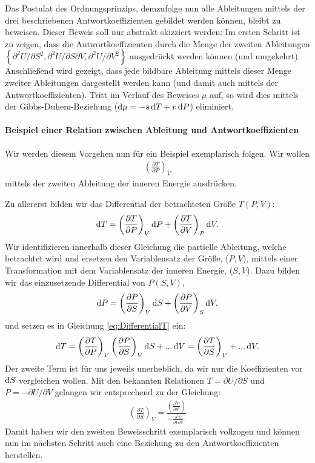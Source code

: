 	Das Postulat des Ordnungsprinzips, demzufolge nun alle Ableitungen mittels der drei beschriebenen Antwortkoeffizienten gebildet werden können, bleibt zu beweisen. Dieser Beweis soll nur abstrakt skizziert werden:
	Im ersten Schritt ist zu zeigen, dass die Antwortkoeffizienten durch die Menge der zweiten Ableitungen $\left\{\partial^2U/\partial S^2,\partial^2U/\partial S\partial V, \partial^2U/\partial V^2\right\}$ ausgedrückt werden können (und umgekehrt). Anschließend wird gezeigt, dass jede bildbare Ableitung mittels dieser Menge zweiter Ableitungen dargestellt werden kann (und damit auch mittels der Antwortkoeffizienten). Tritt im Verlauf des Beweises $\mu$ auf, so wird dies mittels der Gibbs-Duhem-Beziehung ($\mathop{}\!\mathrm{d} \mu =-s\mathop{}\!\mathrm{d} T+v\mathop{}\!\mathrm{d} P$) eliminiert.

	\paragraph*{Beispiel einer Relation zwischen Ableitung und Antwortkoeffizienten} Wir werden diesem Vorgehen nun für ein Beispiel exemplarisch folgen.
	Wir wollen 
	\begin{align*}
		\left(\frac{\partial T}{\partial P}\right)_V
	\end{align*}
	mittels der zweiten Ableitung der inneren Energie ausdrücken.

	Zu allererst bilden wir das Differential der betrachteten Größe $T(P,V)$:
	\begin{align}
		\label{eq:DifferentialT}
		\mathop{}\!\mathrm{d} T=\left(\frac{\partial T}{\partial P}\right)_V\mathop{}\!\mathrm{d} P+\left(\frac{\partial T}{\partial V}\right)_P \mathop{}\!\mathrm{d} V.
	\end{align}
Wir identifizieren innerhalb dieser Gleichung die partielle Ableitung, welche betrachtet wird und ersetzen den Variablensatz der Größe, ($P,V$), mittels einer Transformation mit dem Variablensatz der inneren Energie, ($S,V$). Dazu bilden wir das einzusetzende Differential von $P(S,V)$,
\begin{align*}
	\mathop{}\!\mathrm{d} P=\left(\frac{\partial P}{\partial S}\right)_V\mathop{}\!\mathrm{d} S+\left(\frac{\partial P}{\partial V}\right)_S \mathop{}\!\mathrm{d} V,
\end{align*}
und setzen es in Gleichung \ref{eq:DifferentialT} ein:
\begin{align*}
	\mathop{}\!\mathrm{d} T=\left(\frac{\partial T}{\partial P}\right)_V\left(\frac{\partial P}{\partial S}\right)_V\mathop{}\!\mathrm{d} S+...\mathop{}\!\mathrm{d} V=\left(\frac{\partial T}{\partial S}\right)_V+...\mathop{}\!\mathrm{d} V.
\end{align*}
Der zweite Term ist für uns jeweils unerheblich, da wir nur die Koeffizienten vor $\mathop{}\!\mathrm{d} S$ vergleichen wollen.
Mit den bekannten Relationen $T=\partial U/\partial S$ und $P=-\partial U/\partial V$ gelangen wir entsprechend zu der Gleichung:
\begin{align*}
	\left(\frac{\partial T}{\partial S}\right)_V=\frac{\left(\frac{\partial^2 U}{\partial S^2}\right)}{-\frac{\partial ^2U}{\partial V\partial S}.}
\end{align*}
Damit haben wir den zweiten Beweisschritt exemplarisch vollzogen und können nun im nächsten Schritt auch eine Beziehung zu den Antwortkoeffizienten herstellen.

